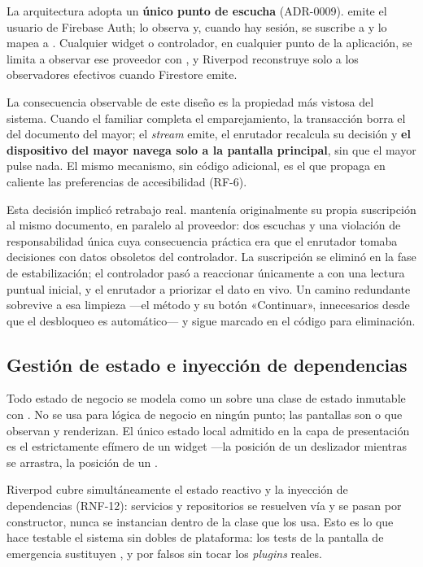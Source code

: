 La arquitectura adopta un \textbf{único punto de escucha} (ADR-0009).  emite
el usuario de Firebase Auth;  lo observa y, cuando hay sesión, se suscribe a
 y lo mapea a . Cualquier widget o controlador, en cualquier punto de
la aplicación, se limita a observar ese proveedor con , y Riverpod reconstruye solo a los
observadores efectivos cuando Firestore emite.

La consecuencia observable de este diseño es la propiedad más vistosa del sistema. Cuando el familiar
completa el emparejamiento, la transacción borra el  del documento del mayor; el
\emph{stream} emite, el enrutador recalcula su decisión y \textbf{el dispositivo del mayor navega solo a la
pantalla principal}, sin que el mayor pulse nada. El mismo mecanismo, sin código adicional, es el que
propaga en caliente las preferencias de accesibilidad (RF-6).

Esta decisión implicó retrabajo real.  mantenía originalmente su propia
suscripción al mismo documento, en paralelo al proveedor: dos escuchas y una violación de responsabilidad
única cuya consecuencia práctica era que el enrutador tomaba decisiones con datos obsoletos del controlador.
La suscripción se eliminó en la fase de estabilización; el controlador pasó a reaccionar únicamente a
 con una lectura puntual inicial, y el enrutador a priorizar el dato en vivo. Un
camino redundante sobrevive a esa limpieza ---el método  y su botón
«Continuar», innecesarios desde que el desbloqueo es automático--- y sigue marcado en el código para
eliminación.

\subsection{Gestión de estado e inyección de dependencias}

Todo estado de negocio se modela como un  sobre una clase de estado inmutable con
. No se usa  para lógica de negocio en ningún punto; las pantallas son
 o  que observan y renderizan. El único estado local
admitido en la capa de presentación es el estrictamente efímero de un widget ---la posición de un
deslizador mientras se arrastra, la posición de un .

Riverpod cubre simultáneamente el estado reactivo y la inyección de dependencias (RNF-12): servicios y
repositorios se resuelven vía  y se pasan por constructor, nunca se instancian dentro de la
clase que los usa. Esto es lo que hace testable el sistema sin dobles de plataforma: los tests de la
pantalla de emergencia sustituyen ,  y  por
falsos sin tocar los \emph{plugins} reales.

